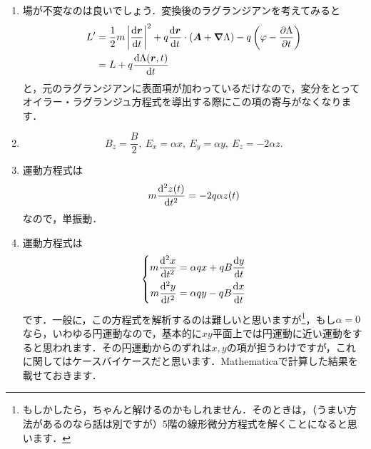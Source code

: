 \documentclass[a4paper,pdflatex,ja=standard]{bxjsarticle}
\begin{document}
\begin{enumerate}
  \item 

  場が不変なのは良いでしょう．変換後のラグランジアンを考えてみると
  \begin{align}
    L^{\prime}
    &=
    \frac{1}{2}m\left|\dv{\bm{r}}{t}\right|^2
    +
    q\dv{\bm{r}}{t}
    \cdot
    (\bm{A}+\bm{\nabla}\Lambda)
    -
    q
    \left(  
      \varphi-\pdv{\Lambda}{t}
    \right)
    \nonumber
    \\
    &=
    L
    +
    q
    \dv{\Lambda(\bm{r},t)}{t}
  \end{align}
  と，元のラグランジアンに表面項が加わっているだけなので，変分をとってオイラー・ラグランジュ方程式を導出する際にこの項の寄与がなくなります．


  \item 

  \begin{equation}
    B_z=\frac{B}{2}
    ,\ 
    E_x=\alpha x
    ,\ 
    E_y=\alpha y
    ,\ 
    E_z=-2\alpha z
    .
  \end{equation}


  \item 

  運動方程式は
  \begin{equation}
    m\dv[2]{z(t)}{t}
    =
    -
    2q\alpha z(t)
  \end{equation}
  なので，単振動．


  \item 

  運動方程式は
  \begin{equation}
    \left\{
      \begin{alignedat}{1}
        m\dv[2]{x}{t}
        &=
        \alpha qx
        +
        qB\dv{y}{t}
        \\
        m\dv[2]{y}{t}
        &=
        \alpha qy
        -
        qB\dv{x}{t}
      \end{alignedat}
    \right.
  \end{equation}
  です．一般に，この方程式を解析するのは難しいと思いますが\footnote{
    もしかしたら，ちゃんと解けるのかもしれません．そのときは，（うまい方法があるのなら話は別ですが）5階の線形微分方程式を解くことになると思います．
  }，もし$\alpha=0$なら，いわゆる円運動なので，基本的に$xy$平面上では円運動に近い運動をすると思われます．その円運動からのずれは$x,y$の項が担うわけですが，これに関してはケースバイケースだと思います．Mathematicaで計算した結果を載せておきます．


\end{enumerate}
\end{document}
